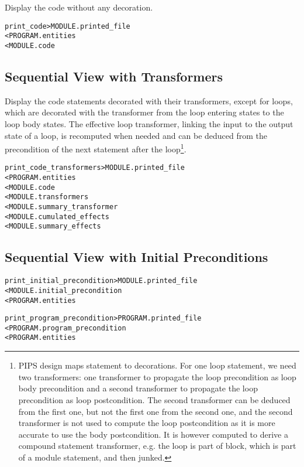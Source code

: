 \documentclass[a4paper]{report}
\newenvironment{PipsMake}{\begin{alltt}}{\end{alltt}}
\newenvironment{PipsPass}[1]{\label{pass:#1}}{}
\begin{document}
\begin{PipsPass}{print_code}
Display the code without any decoration.
\end{PipsPass}

\begin{PipsMake}
print_code                      > MODULE.printed_file
        < PROGRAM.entities
        < MODULE.code
\end{PipsMake}

\subsection{Sequential View with Transformers}

\begin{PipsPass}{print_code_transformers}
Display the code statements decorated with their transformers, except
for loops, which are decorated with the transformer from the loop
entering states to the loop body states. The effective loop
transformer, linking the input to the output state of a loop, is
recomputed when needed and can be deduced from the precondition of the
next statement after the loop\footnote{PIPS design maps statement to
  decorations. For one loop statement, we need two transformers: one
  transformer to propagate the loop precondition as loop body
  precondition and a second transformer to propagate the loop
  precondition as loop postcondition. The second transformer can be
  deduced from the first one, but not the first one from the second
  one, and the second transformer is not used to compute the loop
  postcondition as it is more accurate to use the body
  postcondition. It is however computed to derive a compound statement
  transformer, e.g. the loop is part of block, which is part of a
  module statement, and then junked.}.
\end{PipsPass}

\begin{PipsMake}
print_code_transformers         > MODULE.printed_file
        < PROGRAM.entities
        < MODULE.code
        < MODULE.transformers
        < MODULE.summary_transformer
        < MODULE.cumulated_effects
        < MODULE.summary_effects
\end{PipsMake}

\subsection{Sequential View with Initial Preconditions}

\begin{PipsMake}
print_initial_precondition  > MODULE.printed_file
        < MODULE.initial_precondition
        < PROGRAM.entities

print_program_precondition  > PROGRAM.printed_file
        < PROGRAM.program_precondition
        < PROGRAM.entities
\end{PipsMake}
\end{document}
